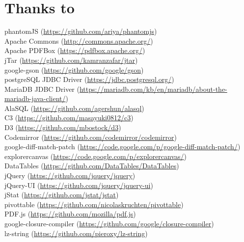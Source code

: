 \documentclass[11pt]{article}
\begin{document}
\section{Thanks to}
phantomJS (\url{https://github.com/ariya/phantomjs})\\
Apache Commons (\url{http://commons.apache.org/})\\
Apache PDFBox (\url{https://pdfbox.apache.org/})\\
jTar (\url{https://github.com/kamranzafar/jtar})\\
google-gson (\url{https://github.com/google/gson})\\
postgreSQL JDBC Driver (\url{https://jdbc.postgresql.org/})\\
MariaDB JDBC Driver (\url{https://mariadb.com/kb/en/mariadb/about-the-mariadb-java-client/})\\
AlaSQL (\url{https://github.com/agershun/alasql})\\
C3 (\url{https://github.com/masayuki0812/c3})\\
D3 (\url{https://github.com/mbostock/d3})\\
Codemirror (\url{https://github.com/codemirror/codemirror})\\
google-diff-match-patch (\url{https://code.google.com/p/google-diff-match-patch/})\\
explorercanvas (\url{https://code.google.com/p/explorercanvas/})\\
DataTables (\url{https://github.com/DataTables/DataTables})\\
jQuery (\url{https://github.com/jquery/jquery})\\
jQuery-UI (\url{https://github.com/jquery/jquery-ui})\\
jStat (\url{https://github.com/jstat/jstat})\\
pivottable (\url{https://github.com/nicolaskruchten/pivottable})\\
PDF.js (\url{https://github.com/mozilla/pdf.js})\\
google-closure-compiler (\url{https://github.com/google/closure-compiler})\\
lz-string (\url{https://github.com/pieroxy/lz-string})\\

\newpage
\end{document}
